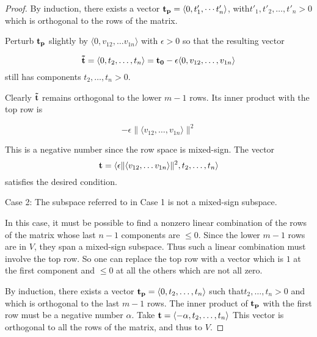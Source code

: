 \documentclass[11pt]{article}
\theoremstyle{plain} \newtheorem{thm}{Theorem}%
\theoremstyle{plain} \newtheorem{define}{Definition}%
\theoremstyle{plain} \newtheorem{example}{Example}%
\theoremstyle{plain} \newtheorem{remark}{Remark}%
\newcommand{\mixed}{mixed-sign}
\begin{document}
\begin{proof}
    \medskip

    By induction, there exists a vector ${\bf t_p} = \langle 0,t'_1,\cdots
    t'_n\rangle$, with\break$t'_1, t'_2, \ldots, t'_n > 0$ which is orthogonal to the rows of the matrix.

    Perturb ${\bf t_p}$ slightly by \epsilon$\langle0, v_{12}, \ldots
    v_{1n}\rangle$ with $\epsilon > 0$ so that the resulting vector

    $${\bf \tilde{t}} = \langle 0, t_2, \ldots, t_n\rangle =
    {\bf t_0} - \epsilon \langle 0,v_{12},\ldots,v_{1n}\rangle$$
    still has components $t_2,\ldots, t_n > 0$.

    Clearly ${\bf \tilde{t}}$ remains orthogonal to the lower $m-1$
    rows.  Its inner product with the top row is

    $$-\epsilon \|\langle v_{12},\ldots,v_{1n}\rangle\|^2$$

    This is a negative number since the row space is \mixed{}.  The
    vector
    $${\bf t} = \langle \epsilon \|\langle v_{12}, \ldots
    v_{1n}\rangle\|^2, t_2, \ldots, t_n\rangle$$
    satisfies the desired condition.
    
    \medskip

    \noindent Case 2:  The subspace referred to in Case 1 is not a
    \mixed{} subspace.

    In this case, it must be possible to find a nonzero linear combination of
    the rows of the matrix whose last $n-1$ components are $\le 0$.
    Since the lower $m-1$ rows are in $V$, they span a \mixed{}
    subspace.  Thus such a linear combination must involve the top row.
    So one can replace the top row with a vector which is $1$ at the
    first component and $\le 0$ at all the others which are not all
    zero.

    By induction, there exists a vector ${\bf t_p} =
    \langle0,t_2,\ldots,t_n\rangle$ such that\break$t_2,\ldots,t_n > 0$ and
    which is orthogonal to the last $m-1$ rows.  The inner product of
    ${\bf t_p}$ with the first row must be a negative number
    $\alpha$.  Take ${\bf t} = \langle -\alpha,t_2,\ldots,t_n\rangle$
    This vector is orthogonal to all the rows of the matrix, and thus to
    $V$.


    
\end{proof}
\end{document}
